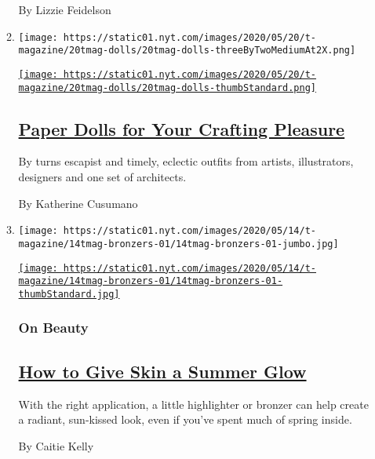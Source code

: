 \begin{enumerate}
\begin{enumerate}
    By Lizzie Feidelson
  \item
    \texttt{[image: https://static01.nyt.com/images/2020/05/20/t-magazine/20tmag-dolls/20tmag-dolls-threeByTwoMediumAt2X.png]}

    \href{/2020/05/20/t-magazine/paper-dolls.html}{\texttt{[image: https://static01.nyt.com/images/2020/05/20/t-magazine/20tmag-dolls/20tmag-dolls-thumbStandard.png]}}

    \hypertarget{paper-dolls-for-your-crafting-pleasure}{%
    \subsection{\texorpdfstring{\href{/2020/05/20/t-magazine/paper-dolls.html}{Paper
    Dolls for Your Crafting
    Pleasure}}{Paper Dolls for Your Crafting Pleasure}}\label{paper-dolls-for-your-crafting-pleasure}}

    By turns escapist and timely, eclectic outfits from artists,
    illustrators, designers and one set of architects.

    By Katherine Cusumano
  \item
    \texttt{[image: https://static01.nyt.com/images/2020/05/14/t-magazine/14tmag-bronzers-01/14tmag-bronzers-01-jumbo.jpg]}

    \href{/2020/05/15/t-magazine/best-bronzers-highlighters-beauty.html}{\texttt{[image: https://static01.nyt.com/images/2020/05/14/t-magazine/14tmag-bronzers-01/14tmag-bronzers-01-thumbStandard.jpg]}}

    \hypertarget{on-beauty}{%
    \subsubsection{On Beauty}\label{on-beauty}}

    \hypertarget{how-to-give-skin-a-summer-glow}{%
    \subsection{\texorpdfstring{\href{/2020/05/15/t-magazine/best-bronzers-highlighters-beauty.html}{How
    to Give Skin a Summer
    Glow}}{How to Give Skin a Summer Glow}}\label{how-to-give-skin-a-summer-glow}}

    With the right application, a little highlighter or bronzer can help
    create a radiant, sun-kissed look, even if you've spent much of
    spring inside.

    By Caitie Kelly
  \end{enumerate}
\end{enumerate}

